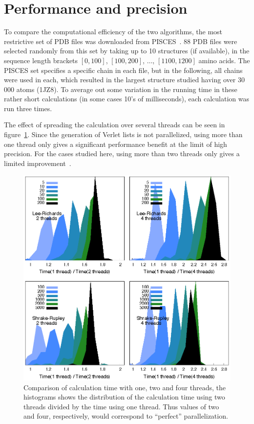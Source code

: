 \documentclass[a4paper,11pt]{article}
\begin{document}
\section{Performance and precision}\label{sec:performance}

To compare the computational efficiency of the two algorithms, the
most restrictive set of PDB files was downloaded from
PISCES~\cite{PISCES}.  88 PDB files were selected randomly from this
set by taking up to 10 structures (if available), in the sequence
length brackets $[0,100]$, $[100,200]$, $\dots$, $[1100,1200]$ amino
acids. The PISCES set specifies a specific chain in each file, but in
the following, all chains were used in each, which resulted in the
largest structure studied having over 30\,000 atoms (1JZ8). To average
out some variation in the running time in these rather short
calculations (in some cases 10's of milliseconds), each calculation was
run three times.

The effect of spreading the calculation over several threads can be
seen in figure~\ref{fig:threads}. Since the generation of Verlet lists
is not parallelized, using more than one thread only gives a
significant performance benefit at the limit of high precision. For
the cases studied here, using more than two threads only gives a
limited improvement~\cite{4cores}.
\begin{figure}
  \begin{center}
  \includegraphics{fig/threads} 
  \caption{Comparison of calculation time with one, two and four
    threads, the histograms shows the distribution of the calculation
    time using two threads divided by the time using one thread. Thus
    values of two and four, respectively, would correspond to
    ``perfect'' parallelization.
    \label{fig:threads}}
  \end{center}
\end{figure}
\end{document}
